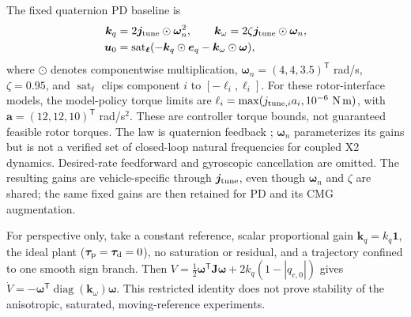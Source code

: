 \documentclass[letterpaper, 10 pt, conference]{ieeeconf}
\newcommand{\T}{^{\mathsf T}}
\newcommand{\sat}{\operatorname{sat}}
\begin{document}
The fixed quaternion PD baseline is
\begin{align}
 \bm k_q&=2\bm j_{\rm tune}\odot\bm\omega_n^2,\qquad
 \bm k_\omega=2\zeta\bm j_{\rm tune}\odot\bm\omega_n,\\
 \bm u_0&=\sat_{\bm\ell}
       (-\bm k_q\odot\bm e_q-\bm k_\omega\odot\bm\omega),
 \label{eq:pd}
\end{align}
where $\odot$ denotes componentwise multiplication,
$\bm\omega_n=(4,4,3.5)\T$ rad/s, $\zeta=0.95$, and
$\sat_{\bm\ell}$ clips component $i$ to $[-\ell_i,\ell_i]$.
For these rotor-interface models, the model-policy torque limits are
$\ell_i=\max(j_{{\rm tune},i}a_i,10^{-6}\ \mathrm{N\,m})$,
with $\bm a=(12,12,10)\T$ rad/s$^2$.
These are controller torque bounds, not guaranteed feasible rotor torques.
The law is quaternion feedback \cite{fresk2013quaternion};
$\bm\omega_n$ parameterizes its gains but is not a verified set of
closed-loop natural frequencies for coupled X2 dynamics.
Desired-rate feedforward and gyroscopic cancellation are omitted.
The resulting gains are vehicle-specific through $\bm j_{\rm tune}$, even though
$\bm\omega_n$ and $\zeta$ are shared; the same fixed gains are then retained
for PD and its CMG augmentation.

For perspective only, take a constant reference, scalar proportional
gain $\bm k_q=k_q\bm1$, the ideal plant
($\bm\tau_{\rm p}=\bm\tau_{\rm d}=0$), no saturation or residual, and a
trajectory confined to one smooth sign branch. Then
$V=\frac12\bm\omega\T\bm J\bm\omega+2k_q(1-|q_{e,0}|)$ gives
$\dot V=-\bm\omega\T\operatorname{diag}(\bm k_\omega)\bm\omega$.
This restricted identity does not prove stability of the anisotropic,
saturated, moving-reference experiments.
\end{document}
